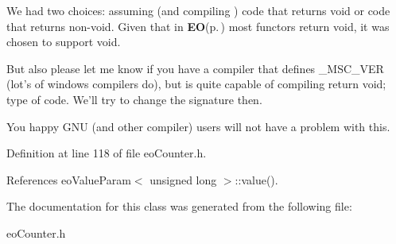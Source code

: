 We had two choices: assuming (and compiling ) code that returns void or code that returns non-void. Given that in {\bf EO}{\rm (p.\,\pageref{class_e_o})} most functors return void, it was chosen to support void.

But also please let me know if you have a compiler that defines \_\-MSC\_\-VER (lot's of windows compilers do), but is quite capable of compiling return void; type of code. We'll try to change the signature then.

You happy GNU (and other compiler) users will not have a problem with this. 

Definition at line 118 of file eo\-Counter.h.

References eo\-Value\-Param$<$ unsigned long $>$::value().

The documentation for this class was generated from the following file:\begin{CompactItemize}
\item 
eo\-Counter.h\end{CompactItemize}
